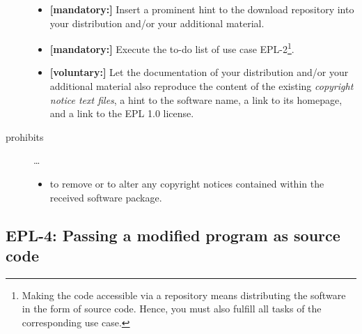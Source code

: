 \begin{description}
\begin{itemize}
  \item \textbf{[mandatory:]} Insert a prominent hint to the download repository
  into your distribution and/or your additional material.
  
  \item \textbf{[mandatory:]} Execute the to-do list of use case EPL-2\footnote{
  Making the code accessible via a repository means distributing the software in
  the form of source code. Hence, you must also fulfill all tasks of the
  corresponding use case.}.
  
  \item \textbf{[voluntary:]} Let the documentation of your distribution and/or
  your additional material also reproduce the content of the existing
  \emph{copyright notice text files}, a hint to the software name, a link to its
  homepage, and a link to the EPL 1.0 license.
    
\end{itemize}

\item[prohibits] \ldots
\begin{itemize}
  \item to remove or to alter any copyright notices contained within the
  received software package.
\end{itemize}

\end{description}

\subsection{EPL-4: Passing a modified program as source code}
\label{OSUC-04-EPL} 

